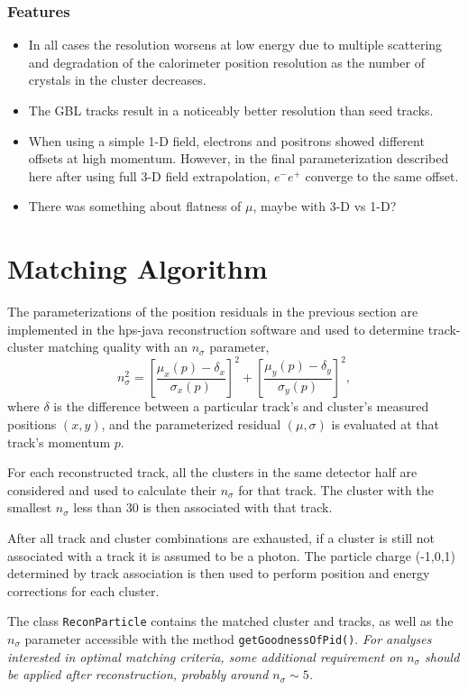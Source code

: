 \documentclass[amsmath,amssymb,notitlepage,12pt]{revtex4-1}
\begin{document}
\subsubsection{Features}
\begin{itemize}
    \item In all cases the resolution worsens at low energy due to multiple scattering and degradation of the calorimeter position resolution as the number of crystals in the cluster decreases.
    \item The GBL tracks result in a noticeably better resolution than seed tracks.
    \item When using a simple 1-D field, electrons and positrons showed different offsets at high momentum.  However, in the final parameterization described here after using full 3-D field extrapolation, $e^-e^+$  converge to the same offset.  
    \item There was something about flatness of $\mu$, maybe with 3-D vs 1-D?
\end{itemize}

\section{Matching Algorithm}
The parameterizations of the position residuals in the previous section are implemented in the hps-java reconstruction software and used to determine track-cluster matching quality with an $n_\sigma$ parameter,
\begin{equation}
    n_\sigma^2 = \left[\frac{\mu_x(p)-\delta_x}{\sigma_x(p)}\right]^2 + \left[\frac{\mu_y(p)-\delta_y}{\sigma_y(p)}\right]^2,
    \label{eq:nsigma}
\end{equation}
where $\delta$ is the difference between a particular track's and cluster's measured positions $(x,y)$, and the parameterized residual $(\mu,\sigma)$ is evaluated at that track's momentum $p$.

For each reconstructed track, all the clusters in the same detector half are considered and used to calculate their $n_\sigma$ for that track.
The cluster with the smallest $n_\sigma$ less than 30 is then associated with that track.

After all track and cluster combinations are exhausted, if a cluster is still not associated with a track it is assumed to be a photon.  
The particle charge (-1,0,1) determined by track association is then used to perform position and energy corrections for each cluster.

The class \texttt{ReconParticle} contains the matched cluster and tracks, as well as the $n_\sigma$ parameter accessible with the method \texttt{getGoodnessOfPid()}.  {\em For analyses interested in optimal matching criteria, some additional requirement on $n_\sigma$ should be applied after reconstruction, probably around $n_\sigma\sim 5$.}
\end{document}
